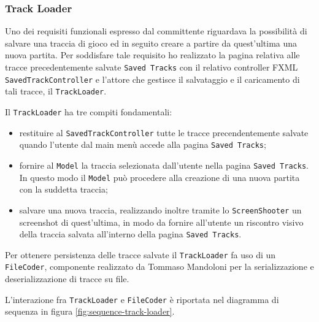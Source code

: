 \subsubsection{Track Loader}\label{subsec:track-loader}
Uno dei requisiti funzionali espresso dal committente riguardava la possibilità di salvare una traccia di gioco ed in seguito
creare a partire da quest'ultima una nuova partita. Per soddisfare tale requisito ho realizzato la pagina relativa alle
tracce precedentemente salvate \texttt{Saved Tracks} con il relativo controller FXML \texttt{SavedTrackController} e l'attore che gestisce il salvataggio
e il caricamento di tali tracce, il \texttt{TrackLoader}.

Il \texttt{TrackLoader} ha tre compiti fondamentali:
\begin{itemize}
    \item restituire al \texttt{SavedTrackController} tutte le tracce precendentemente salvate quando l'utente
        dal main menù accede alla pagina \texttt{Saved Tracks};
    \item fornire al \texttt{Model} la traccia selezionata dall'utente nella pagina \texttt{Saved Tracks}.
          In questo modo il \texttt{Model} può procedere alla creazione di una nuova partita con la suddetta traccia;
    \item salvare una nuova traccia, realizzando inoltre tramite lo \texttt{ScreenShooter} un screenshot di quest'ultima,
    in modo da fornire all'utente un riscontro visivo della traccia salvata all'interno della pagina \texttt{Saved Tracks}.
\end{itemize}

Per ottenere persistenza delle tracce salvate il \texttt{TrackLoader} fa uso di un \texttt{FileCoder}, componente realizzato
da Tommaso Mandoloni per la serializzazione e deserializzazione di tracce su file.

L'interazione fra \texttt{TrackLoader} e \texttt{FileCoder} è riportata nel diagramma di sequenza in figura \ref{fig:sequence-track-loader}.


